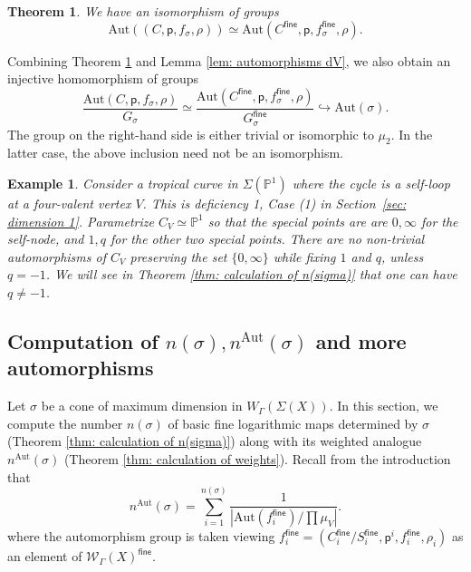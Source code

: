 \documentclass{article}
\def\cW{\mathcal{W}}
\newtheorem{theorem}[definition]{Theorem}
\newtheorem{example}[definition]{Example}
\newcommand{\fine}{\mathsf{fine}}
\newcommand{\nn}{n^{\operatorname{Aut}}}
\begin{document}
\begin{theorem}\label{thm: automorphisms}
        We have an isomorphism of groups
        $$
        \mathrm{Aut}((C,\mathsf{p}, f_\sigma,  \rho)) \simeq \mathrm{Aut}(C^\fine,\mathsf{p}, f^\fine_\sigma,  \rho).
        $$
    \end{theorem}


Combining Theorem \ref{thm: automorphisms} and Lemma \ref{lem: automorphisms dV}, we also obtain an injective homomorphism of groups
\begin{equation}\label{eqn:aut_injection}
\frac{\mathrm{Aut}(C,\mathsf{p},f_\sigma,\rho)}{G_\sigma}
\simeq
\frac{\mathrm{Aut}(C^\fine,\mathsf{p},f^\fine_\sigma,\rho)}{G^\fine_\sigma}
\hookrightarrow
\mathrm{Aut}(\sigma).
\end{equation}
The group on the right-hand side is either trivial or isomorphic to $\mu_2$. In the latter case, the above inclusion need not be an isomorphism. 

\begin{example}
    Consider a tropical curve in $\Sigma(\mathbb{P}^1)$ where the cycle is a self-loop at a four-valent vertex $V$. This is deficiency 1, Case (1) in Section~\ref{sec: dimension 1}. Parametrize $C_V \simeq \mathbb{P}^1$ so that the special points are  are $0, \infty$ for the self-node, and $1, q$ for the other two special points. There are no non-trivial automorphisms of $C_V$ preserving the set $\{0,\infty \}$ while fixing $1$ and $q$, unless $q = -1$.  We will see in Theorem \ref{thm: calculation of n(sigma)} that one can have $q \neq -1$. 
\end{example}


\subsection{Computation of $n(\sigma), \nn(\sigma)$ and more automorphisms}


Let $\sigma$ be a cone of maximum dimension in $W_{\Gamma}(\Sigma(X))$. In this section, we compute the number $n(\sigma)$ of basic fine logarithmic maps determined by $\sigma$ (Theorem \ref{thm: calculation of n(sigma)}) along with its weighted analogue $\nn(\sigma)$ (Theorem \ref{thm: calculation of weights}). Recall from the introduction that  
$$
\nn(\sigma)=\sum_{i=1}^{n(\sigma)} \frac{1}{|\mathrm{Aut}(f_i^\fine)/ \prod \mu_V|}.
$$ 
where the automorphism group is taken viewing 
$
f_i^\fine= (C_{i}^{\mathsf{fine}}/S_{i}^{\mathsf{fine}}, \mathsf{p}^{i}, f_{i}^{\mathsf{fine}}, \rho_{i})
$
as an element of $\cW_\Gamma(X)^\fine$.
\end{document}
